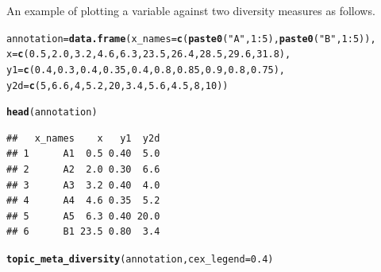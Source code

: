 \documentclass[12pt]{article}\usepackage[]{graphicx}\usepackage[usenames,dvipsnames]{color}
\makeatletter
\newcommand{\hlnum}[1]{\textcolor[rgb]{0.686,0.059,0.569}{#1}}%
\newcommand{\hlstr}[1]{\textcolor[rgb]{0.192,0.494,0.8}{#1}}%
\newcommand{\hlopt}[1]{\textcolor[rgb]{0,0,0}{#1}}%
\newcommand{\hlstd}[1]{\textcolor[rgb]{0.345,0.345,0.345}{#1}}%
\newcommand{\hlkwb}[1]{\textcolor[rgb]{0.69,0.353,0.396}{#1}}%
\newcommand{\hlkwc}[1]{\textcolor[rgb]{0.333,0.667,0.333}{#1}}%
\newcommand{\hlkwd}[1]{\textcolor[rgb]{0.737,0.353,0.396}{\textbf{#1}}}%
\newenvironment{kframe}{%
 \def\at@end@of@kframe{}%
 \ifinner\ifhmode%
  \def\at@end@of@kframe{\end{minipage}}%
  \begin{minipage}{\columnwidth}%
 \fi\fi%
 \def\FrameCommand##1{\hskip\@totalleftmargin \hskip-\fboxsep
 \colorbox{shadecolor}{##1}\hskip-\fboxsep
     \hskip-\linewidth \hskip-\@totalleftmargin \hskip\columnwidth}%
 \MakeFramed {\advance\hsize-\width
   \@totalleftmargin\z@ \linewidth\hsize
   \@setminipage}}%
 {\par\unskip\endMakeFramed%
 \at@end@of@kframe}
\newenvironment{knitrout}{}{} %
\makeatother
\begin{document}
An example of plotting  a variable against two diversity measures as follows.

\begin{knitrout}
\color{fgcolor}\begin{kframe}
\begin{alltt}
\hlstd{annotation} \hlkwb{=} \hlkwd{data.frame}\hlstd{(}\hlkwc{x_names} \hlstd{=} \hlkwd{c}\hlstd{(}\hlkwd{paste0}\hlstd{(}\hlstr{"A"}\hlstd{,}\hlnum{1}\hlopt{:}\hlnum{5}\hlstd{),} \hlkwd{paste0}\hlstd{(}\hlstr{"B"}\hlstd{,}\hlnum{1}\hlopt{:}\hlnum{5}\hlstd{)),}
    \hlkwc{x} \hlstd{=} \hlkwd{c}\hlstd{(}\hlnum{0.5}\hlstd{,}\hlnum{2.0}\hlstd{,} \hlnum{3.2}\hlstd{,} \hlnum{4.6}\hlstd{,} \hlnum{6.3}\hlstd{,}  \hlnum{23.5}\hlstd{,} \hlnum{26.4}\hlstd{,} \hlnum{28.5}\hlstd{,} \hlnum{29.6}\hlstd{,} \hlnum{31.8}\hlstd{),}
    \hlkwc{y1} \hlstd{=} \hlkwd{c}\hlstd{(}\hlnum{0.4}\hlstd{,} \hlnum{0.3}\hlstd{,} \hlnum{0.4}\hlstd{,} \hlnum{0.35}\hlstd{,} \hlnum{0.4}\hlstd{,} \hlnum{0.8}\hlstd{,} \hlnum{0.85}\hlstd{,} \hlnum{0.9}\hlstd{,} \hlnum{0.8}\hlstd{,} \hlnum{0.75}\hlstd{),}
    \hlkwc{y2d} \hlstd{=}\hlkwd{c}\hlstd{(}\hlnum{5}\hlstd{,} \hlnum{6.6}\hlstd{,} \hlnum{4}\hlstd{,} \hlnum{5.2}\hlstd{,} \hlnum{20}\hlstd{,} \hlnum{3.4}\hlstd{,} \hlnum{5.6}\hlstd{,} \hlnum{4.5}\hlstd{,} \hlnum{8}\hlstd{,} \hlnum{10}\hlstd{))}

\hlkwd{head}\hlstd{(annotation)}
\end{alltt}
\begin{verbatim}
##   x_names    x   y1  y2d
## 1      A1  0.5 0.40  5.0
## 2      A2  2.0 0.30  6.6
## 3      A3  3.2 0.40  4.0
## 4      A4  4.6 0.35  5.2
## 5      A5  6.3 0.40 20.0
## 6      B1 23.5 0.80  3.4
\end{verbatim}
\begin{alltt}
\hlkwd{topic_meta_diversity}\hlstd{(annotation,} \hlkwc{cex_legend} \hlstd{=} \hlnum{0.4}\hlstd{)}
\end{alltt}
\end{kframe}
\end{knitrout}
\end{document}
